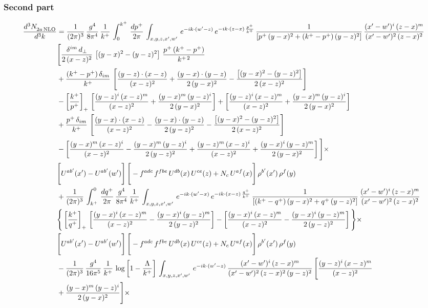 \documentclass[9pt]{article}
\numberwithin{equation}{section}
\begin{document}
\subsubsection*{Second part}
\begin{align}
    \frac{d^{3}N_{2a\,\rm NLO}^{\rm}}{d^{3}k}  & =  \frac{1}{(2\pi)^{3}}\, \frac{g^{4}}{8\pi^{4}}\,\frac{1}{k^{+}}\,\int_{0}^{k^{+}}\, \frac{dp^{+}}{2\pi}\,\int_{x,y,z,x',w'}\,e^{-ik\cdot(w'-z)}\,e^{-ik\cdot (z-x)\,\frac{p^{+}}{k^{+}}}\,\frac{1}{\left[p^{+}\,(y-x)^{2}+(k^{+}-p^{+})\,(y-z)^{2}\right]}\, \frac{(x'-w')^{i}\,(z-x)^{m}}{(x'-w')^{2}\,(z-x)^{2}} \notag \\ & \Bigg[\frac{\delta^{im}\,d_{\perp}}{2\,(x-z)^{2}}\,\left[(y-x)^{2}-(y-z)^{2}\right]\,\frac{p^{+}\,(k^{+}-p^{+})}{k^{+\,2}}\notag \\ & +\frac{(k^{+}-p^{+})\,\delta_{im}}{k^{+}}\,\left[\frac{(y-z)\cdot (x-z)}{(x-z)^{2}}+\frac{(y-x)\cdot (y-z)}{2\,(y-x)^{2}}-\frac{\left[(y-x)^{2}-(y-z)^{2}\right]}{2\,(x-z)^{2}}\right]\notag \\ & -\left[\frac{k^{+}}{p^{+}}\right]_{+}\,\left[\frac{(y-z)^{i}\,(x-z)^{m}}{(x-z)^{2}}+\frac{(y-x)^{m}\,(y-z)^{i}}{2\,(y-x)^{2}}\right]+ \left[\frac{(y-z)^{i}\,(x-z)^{m}}{(x-z)^{2}}+\frac{(y-x)^{m}\,(y-z)^{i}}{2\,(y-x)^{2}}\right]\notag \\ & +\frac{p^{+}\,\delta_{im}}{k^{+}}\,\left[\frac{(y-x)\cdot (x-z)}{(x-z)^{2}}-\frac{(y-x)\cdot (y-z)}{2\,(y-z)^{2}}-\frac{\left[(y-x)^{2}-(y-z)^{2}\right]}{2\,(x-z)^{2}}\right]\notag \\ &-\left[\frac{(y-x)^{m}\,(x-z)^{i}}{(x-z)^{2}}-\frac{(y-x)^{m}\,(y-z)^{i}}{2\,(y-z)^{2}}+\frac{(y-z)^{m}\,(x-z)^{i}}{(x-z)^{2}}+\frac{(y-x)^{i}\,(y-z)^{m}}{2\,(y-x)^{2}}\right]\Bigg]\times \notag \\ & \Bigg[U^{ab'}(x')-U^{ab'}(w')\Bigg]\,\Bigg[-f^{adc}\,f^{fbe}\,U^{db}(x)\,U^{ce}(z)+N_{c}\,U^{af}(x)\Bigg]\,\rho^{b'}(x')\,\rho^{f}(y)\notag \\ & + \frac{1}{(2\pi)^{3}}\,\int^{0}_{k^{+}}\, \frac{dq^{+}}{2\pi} \,\frac{g^{4}}{8\pi^{4}}\,\frac{1}{k^{+}}\, \int_{x,y,z,x',w'}\,e^{-ik\cdot(w'-x)}\,e^{-ik\cdot (x-z)\,\frac{q^{+}}{k^{+}}}\, \frac{1}{\left[(k^{+}-q^{+})\,(y-x)^{2}+q^{+}\,(y-z)^{2}\right]}\, \frac{(x'-w')^{i}\,(z-x)^{m}}{(x'-w')^{2}\,(z-x)^{2}} \notag \\ &\Bigg\{\left[\frac{k^{+}}{q^{+}}\right]_{+}\,\left[\frac{(y-x)^{i}\,(x-z)^{m}}{(x-z)^{2}}-\frac{(y-x)^{i}\,(y-z)^{m}}{2\,(y-z)^{2}}\right] -\left[\frac{(y-x)^{i}\,(x-z)^{m}}{(x-z)^{2}}-\frac{(y-x)^{i}\,(y-z)^{m}}{2\,(y-z)^{2}}\right]\Bigg\}\times\,\notag \\ & \Bigg[U^{ab'}(x')-U^{ab'}(w')\Bigg]\,\Bigg[-f^{adc}\,f^{fbe}\,U^{db}(x)\,U^{ce}(z)+N_{c}\,U^{af}(x)\Bigg]\,\rho^{b'}(x')\,\rho^{f}(y)\notag \\ & - \frac{1}{(2\pi)^{3}}\, \frac{g^{4}}{16\pi^{5}}\,\frac{1}{k^{+}}\,\log{\left[1-\frac{\Lambda}{k^{+}}\right]}\, \int_{x,y,z,x',w'}\, e^{-ik\cdot(w'-z)}\,\frac{(x'-w')^{i}\,(z-x)^{m}}{(x'-w')^{2}\,(z-x)^{2}\, (y-z)^{2}}\,\Bigg[\frac{(y-z)^{i}\,(x-z)^{m}}{(x-z)^{2}}\notag \\ & +\frac{(y-x)^{m}\,(y-z)^{i}}{2\,(y-x)^{2}}\Bigg]\times\, 
\end{align}
\end{document}
